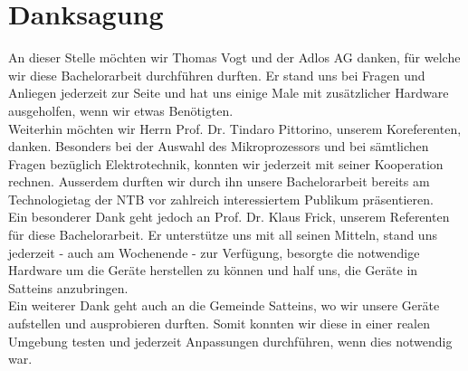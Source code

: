\section{Danksagung}
An dieser Stelle möchten wir Thomas Vogt und der Adlos AG danken, für welche wir diese Bachelorarbeit durchführen durften. Er stand uns bei Fragen und Anliegen jederzeit zur Seite und hat uns einige Male mit zusätzlicher Hardware ausgeholfen, wenn wir etwas Benötigten.\\

Weiterhin möchten wir Herrn Prof. Dr. Tindaro Pittorino, unserem Koreferenten, danken. Besonders bei der Auswahl des Mikroprozessors und bei sämtlichen Fragen bezüglich Elektrotechnik, konnten wir jederzeit mit seiner Kooperation rechnen. Ausserdem durften wir durch ihn unsere Bachelorarbeit bereits am Technologietag der NTB vor zahlreich interessiertem Publikum präsentieren.\\

Ein besonderer Dank geht jedoch an Prof. Dr. Klaus Frick, unserem Referenten für diese Bachelorarbeit. Er unterstütze uns mit all seinen Mitteln, stand uns jederzeit - auch am Wochenende - zur Verfügung, besorgte die notwendige Hardware um die Geräte herstellen zu können und half uns, die Geräte in Satteins anzubringen.\\

Ein weiterer Dank geht auch an die Gemeinde Satteins, wo wir unsere Geräte aufstellen und ausprobieren durften. Somit konnten wir diese in einer realen Umgebung testen und jederzeit Anpassungen durchführen, wenn dies notwendig war.


\newpage
